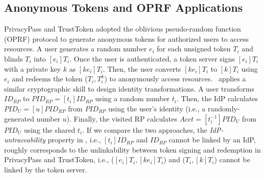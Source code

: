 \subsection{Anonymous Tokens and OPRF Applications}
\label{sec:related}

\newc
PrivacyPass and TrustToken \cite{privacypass,trusttoken} 
adopted the oblivious pseudo-random function (OPRF) protocol \cite{oprf-proved,voprf-proved,oprf-bitcoin-wallet} to generate anonymous tokens for authorized users to access resources.
 A user generates a random number $e_i$ for each unsigned token $T_i$ and blinds $T_i$ into $[e_i]T_i$.
Once the user is authenticated, a token server signs $[e_i]T_i$ with a private key $k$ as $[k e_i]T_i$. Then, the user converts $[ke_i]T_i$ to $[k]T_i$ using $e_i$ and redeems the token ($T_i, T_i^k$) to anonymously access resources.
\usso\ applies a similar cryptographic skill to design identity transformations. A user transforms $ID_{RP}$ to $PID_{RP} = [t_i]ID_{RP}$ using a random number $t_i$.
Then, the IdP calculates $PID_U = [u]PID_{RP}$ %
from $PID_{RP}$ using the user's identity (i.e., a randomly-generated number $u$).
Finally, the visited RP calculates $Acct = [t_i^{-1}]PID_{U}$ from $PID_{U}$ using the shared $t_i$.
If we compare the two approaches, the \emph{IdP-untraceability} property in \usso, i.e., $[t_i]ID_{RP}$ and $ID_{RP}$ cannot be linked by an IdP, roughly corresponds to
the unlinkability between token signing and redemption in PrivacyPass and TrustToken, i.e., ($[e_i]T_i, [ke_i]T_i$) and  ($T_i, [k]T_i$) cannot be linked by the token server.

